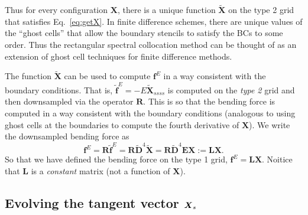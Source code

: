 Thus for every configuration $\bm{X}$, there is a unique function $\tilde{\bm{X}}$ on the type 2 grid that satisfies Eq.\ \eqref{eq:getX}.  In finite difference schemes, there are unique values of the ``ghost cells'' that allow the boundary stencils to satisfy the BCs to some order. Thus the rectangular spectral collocation method can be thought of as an extension of ghost cell techniques for finite difference methods.  

The function $\tilde{\bm{X}}$ can be used to compute $\bm{f}^E$ in a way consistent with the boundary conditions. That is, $\tilde{\bm{f}}^E=-E\tilde{\bm{X}}_{ssss}$ is computed on the \textit{type 2} grid and then downsampled via the operator $\bm{R}$. This is so that the bending force is computed in a way consistent with the boundary conditions (analogous to using ghost cells at the boundaries to compute the fourth derivative of $\bm{X}$). We write the downsampled bending force as
\begin{equation}
\label{eq:fE}
\bm{f}^E=\bm{R}\tilde{\bm{f}}^E=\bm{R}\tilde{\bm{D}}^4 \tilde{\bm{X}} = \bm{R}\tilde{\bm{D}}^4 \bm{E}\bm{X}:=\bm{L}\bm{X}.
\end{equation}
So that we have defined the bending force on the type 1 grid, $\bm{f}^E=\bm{L}\bm{X}$. Noitice that $\bm{L}$ is a \textit{constant} matrix (not a function of $\bm{X}$). 

\subsection{Evolving the tangent vector $\boldsymbol{X}_s$}

